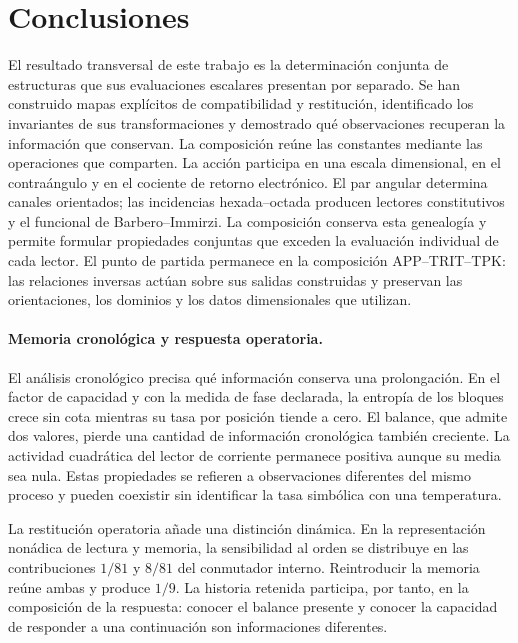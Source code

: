 \section{Conclusiones}
\label{md:conclusiones}
El resultado transversal de este trabajo es la determinación conjunta de
estructuras que sus evaluaciones escalares presentan por separado. Se han
construido mapas explícitos de compatibilidad y restitución, identificado
los invariantes de sus transformaciones y demostrado qué observaciones
recuperan la información que conservan. La composición reúne las constantes
mediante las operaciones que comparten.
La acción participa en una escala dimensional, en el contraángulo y en el
cociente de retorno electrónico. El par angular determina canales
orientados; las incidencias hexada--octada producen lectores constitutivos
y el funcional de Barbero--Immirzi. La composición conserva esta genealogía
y permite formular propiedades conjuntas que exceden la evaluación
individual de cada lector. El punto de partida permanece en la composición
APP--TRIT--TPK: las relaciones inversas actúan sobre sus salidas construidas
y preservan las orientaciones, los dominios y los datos dimensionales que
utilizan.

\paragraph{Memoria cronológica y respuesta operatoria.}

El análisis cronológico precisa qué información conserva una prolongación.
En el factor de capacidad y con la medida de fase declarada, la entropía
de los bloques crece sin cota mientras su tasa por posición tiende a cero.
El balance, que admite dos valores, pierde una cantidad de información
cronológica también creciente. La actividad cuadrática del lector de
corriente permanece positiva aunque su media sea nula. Estas propiedades
se refieren a observaciones diferentes del mismo proceso y pueden
coexistir sin identificar la tasa simbólica con una temperatura.

La restitución operatoria añade una distinción dinámica. En la
representación nonádica de lectura y memoria, la sensibilidad al orden
se distribuye en las contribuciones \(1/81\) y \(8/81\) del
conmutador interno. Reintroducir la memoria reúne ambas y produce
\(1/9\). La historia retenida participa, por tanto, en la composición
de la respuesta: conocer el balance presente y conocer la capacidad
de responder a una continuación son informaciones diferentes.

